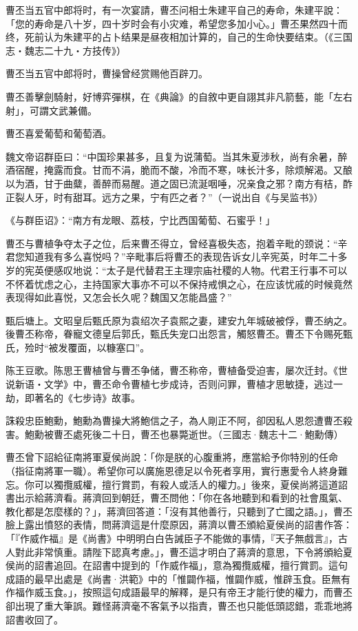 曹丕当五官中郎将时，有一次宴請，曹丕问相士朱建平自己的寿命，朱建平說：「您的寿命是八十岁，四十岁时会有小灾难，希望您多加小心。」曹丕果然四十而终，死前认为朱建平的占卜结果是昼夜相加计算的，自己的生命快要结束。（《三国志‧魏志二十九‧方技传》）

曹丕当五官中郎将时，曹操曾经赏赐他百辟刀。

曹丕善擊劍騎射，好博弈彈棋，在《典論》的自敘中更自詡其非凡箭藝，能「左右射」，可謂文武兼備。

曹丕喜爱葡萄和葡萄酒。

魏文帝诏群臣曰：“中国珍果甚多，且复为说蒲萄。当其朱夏涉秋，尚有余暑，醉酒宿醒，掩露而食。甘而不涓，脆而不酸，冷而不寒，味长汁多，除烦解渴。又酿以为酒，甘于曲糵，善醉而易醒。道之固已流涎咽唾，况亲食之邪？南方有桔，酢正裂人牙，时有甜耳。远方之果，宁有匹之者？”（一说出自《与吴监书》）

《与群臣诏》：“南方有龙眼、荔枝，宁比西国葡萄、石蜜乎！」

曹丕与曹植争夺太子之位，后来曹丕得立，曾经喜极失态，抱着辛毗的颈说：“辛君您知道我有多么喜悦吗？”辛毗事后将曹丕的表现告诉女儿辛宪英，时年二十多岁的宪英便感叹地说：“太子是代替君王主理宗庙社稷的人物。代君王行事不可以不怀着忧虑之心，主持国家大事亦不可以不保持戒惧之心，在应该忧戚的时候竟然表现得如此喜悦，又怎会长久呢？魏国又怎能昌盛？”

甄后塘上。文昭皇后甄氏原为袁绍次子袁熙之妻，建安九年城破被俘，曹丕纳之。後曹丕称帝，眷寵文德皇后郭氏，甄氏失宠口出怨言，觸怒曹丕。曹丕下令赐死甄氏，殓时“被发覆面，以糠塞口”。

陈王豆歌。陈思王曹植曾与曹丕争储，曹丕称帝，曹植备受迫害，屡次迁封。《世说新语‧文学》中，曹丕命令曹植七步成诗，否则问罪，曹植才思敏捷，逃过一劫，即著名的《七步诗》故事。

誅殺忠臣鮑勳，鮑勳為曹操大將鮑信之子，為人剛正不阿，卻因私人恩怨遭曹丕殺害。鮑勳被曹丕處死後二十日，曹丕也暴斃逝世。（三國志·魏志十二·鮑勳傳）

曹丕曾下詔給征南將軍夏侯尚說：「你是朕的心腹重將，應當給予你特別的任命（指征南將軍一職）。希望你可以廣施恩德足以令死者享用，實行惠愛令人終身難忘。你可以獨攬威權，擅行賞罰，有殺人或活人的權力。」後來，夏侯尚將這道詔書出示給蔣濟看。蔣濟回到朝廷，曹丕問他：「你在各地聽到和看到的社會風氣、教化都是怎麼樣的？」，蔣濟回答道：「沒有其他善行，只聽到了亡國之語。」，曹丕臉上露出憤怒的表情，問蔣濟這是什麼原因，蔣濟以曹丕頒給夏侯尚的詔書作答：「『作威作福』是《尚書》中明明白白告誡臣子不能做的事情，『天子無戲言』，古人對此非常慎重。請陛下認真考慮。」，曹丕這才明白了蔣濟的意思，下令將頒給夏侯尚的詔書追回。在詔書中提到的「作威作福」，意為獨攬威權，擅行賞罰。這句成語的最早出處是《尚書·洪範》中的「惟闢作福，惟闢作威，惟辟玉食。臣無有作福作威玉食。」，按照這句成語最早的解釋，是只有帝王才能行使的權力，而曹丕卻出現了重大筆誤。難怪蔣濟毫不客氣予以指責，曹丕也只能低頭認錯，乖乖地將詔書收回了。

